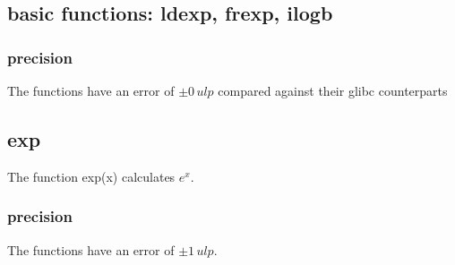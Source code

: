 \documentclass[10pt,a4paper]{article}
\numberwithin{equation}{subsection}
\begin{document}
\subsection{basic functions: ldexp, frexp, ilogb}
\label{sub_sec:base_math}
\subsubsection{precision}
The functions have an error of $ \pm 0\, ulp$ compared against their glibc
counterparts

\subsection{exp}
\label{sub_sec:exp}
The function exp(x) calculates $ e^x $.

\subsubsection{precision}
The functions have an error of $ \pm 1\, ulp$.
\end{document}
